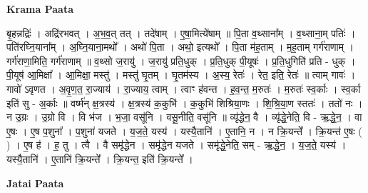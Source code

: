 \documentclass[17pt]{extarticle}
\begin{document}
\textbf{Krama Paata} \newline

बृ॒हन्नद्रिः॑ । अद्रि॑रभवत् । अ॒भ॒व॒त् तत् । तदे॑षाम् । ए॒षा॒मित्ये॑षाम् ॥ पि॒ता व॒थ्साना᳚म् । व॒थ्साना॒म् पतिः॑ । पति॑रघ्नि॒याना᳚म् । अ॒घ्नि॒याना॒मथो᳚ । अथो॑ पि॒ता । अथो॒ इत्यथो᳚ । पि॒ता म॑ह॒ताम् । म॒ह॒ताम् गर्ग॑राणाम् । गर्ग॑राणा॒मिति॒ गर्ग॑राणाम् ॥ व॒थ्सो ज॒रायु॑ । ज॒रायु॑ प्रति॒धुक् । प्र॒ति॒धुक् पी॒यूषः॑ । प्र॒ति॒धुगिति॑ प्रति - धुक् । पी॒यूष॑ आ॒मिक्षा᳚ । आ॒मिक्षा॒ मस्तु॑ । मस्तु॑ घृ॒तम् । घृ॒तम॑स्य । अ॒स्य॒ रेतः॑ । रेत॒ इति॒ रेतः॑ ॥ त्वाम् गावः॑ । गावो॑ ऽवृणत । अ॒वृ॒ण॒त॒ रा॒ज्याय॑ । रा॒ज्याय॒ त्वाम् । त्वाꣳ ह॑वन्त । ह॒व॒न्त॒ म॒रुतः॑ । म॒रुतः॑ स्व॒र्काः । स्व॒र्का इति॑ सु - अ॒र्काः ॥ वर्ष्म॑न् क्ष॒त्रस्य॑ । क्ष॒त्रस्य॑ क॒कुभि॑ । क॒कुभि॑ शिश्रिया॒णः । शि॒श्रि॒या॒ण स्ततः॑ । ततो॑ नः । न उ॒ग्रः । उ॒ग्रो वि । वि भ॑ज । भ॒जा॒ वसू॑नि । वसू॒नीति॒ वसू॑नि ॥ व्यृ॑द्धेन॒ वै । व्यृ॑द्धे॒नेति॒ वि - ऋ॒द्धे॒न॒ । वा ए॒षः । ए॒ष प॒शुना᳚ । प॒शुना॑ यजते । य॒ज॒ते॒ यस्य॑ । यस्यै॒तानि॑ । ए॒तानि॒ न । न क्रि॒यन्ते᳚ । क्रि॒यन्त॑ ए॒षः ( ) । ए॒ष ह॑ । ह॒ तु । त्वै । वै समृ॑द्धेन । समृ॑द्धेन यजते । समृ॑द्धे॒नेति॒ सम् - ऋ॒द्धे॒न॒ । य॒ज॒ते॒ यस्य॑ । यस्यै॒तानि॑ । ए॒तानि॑ क्रि॒यन्ते᳚ । क्रि॒यन्त॒ इति॑ क्रि॒यन्ते᳚ । \newline

\textbf{Jatai Paata} \newline
\end{document}
